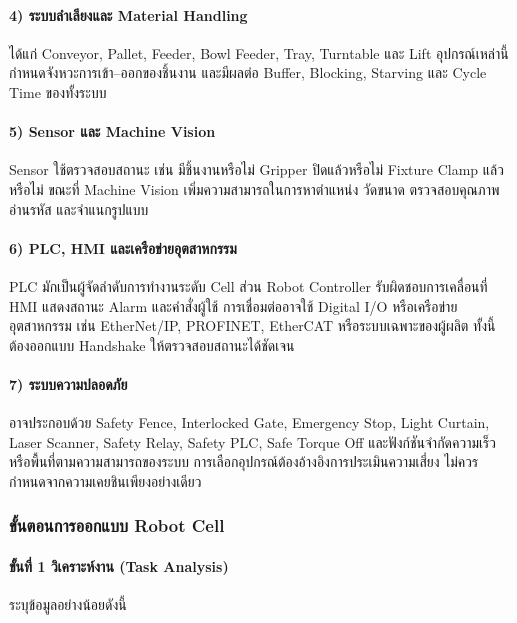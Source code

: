 \paragraph{4) ระบบลำเลียงและ Material Handling}

ได้แก่ Conveyor, Pallet, Feeder, Bowl Feeder, Tray, Turntable และ Lift อุปกรณ์เหล่านี้กำหนดจังหวะการเข้า–ออกของชิ้นงาน และมีผลต่อ Buffer, Blocking, Starving และ Cycle Time ของทั้งระบบ

\paragraph{5) Sensor และ Machine Vision}

Sensor ใช้ตรวจสอบสถานะ เช่น มีชิ้นงานหรือไม่ Gripper ปิดแล้วหรือไม่ Fixture Clamp แล้วหรือไม่ ขณะที่ Machine Vision เพิ่มความสามารถในการหาตำแหน่ง วัดขนาด ตรวจสอบคุณภาพ อ่านรหัส และจำแนกรูปแบบ

\paragraph{6) PLC, HMI และเครือข่ายอุตสาหกรรม}

PLC มักเป็นผู้จัดลำดับการทำงานระดับ Cell ส่วน Robot Controller รับผิดชอบการเคลื่อนที่ HMI แสดงสถานะ Alarm และคำสั่งผู้ใช้ การเชื่อมต่ออาจใช้ Digital I/O หรือเครือข่ายอุตสาหกรรม เช่น EtherNet/IP, PROFINET, EtherCAT หรือระบบเฉพาะของผู้ผลิต ทั้งนี้ต้องออกแบบ Handshake ให้ตรวจสอบสถานะได้ชัดเจน

\paragraph{7) ระบบความปลอดภัย}

อาจประกอบด้วย Safety Fence, Interlocked Gate, Emergency Stop, Light Curtain, Laser Scanner, Safety Relay, Safety PLC, Safe Torque Off และฟังก์ชันจำกัดความเร็วหรือพื้นที่ตามความสามารถของระบบ การเลือกอุปกรณ์ต้องอ้างอิงการประเมินความเสี่ยง ไม่ควรกำหนดจากความเคยชินเพียงอย่างเดียว

\subsubsection{ขั้นตอนการออกแบบ Robot Cell}

\paragraph{ขั้นที่ 1 วิเคราะห์งาน (Task Analysis)}

ระบุข้อมูลอย่างน้อยดังนี้

